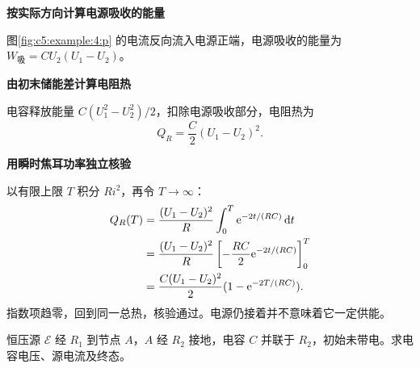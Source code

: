 \begin{solution}
\par\medskip{}\noindent\textbf{按实际方向计算电源吸收的能量}\par\nobreak
图\ref{fig:c5:example:4:p} 的电流反向流入电源正端，电源吸收的能量为 $W_{\text{吸}}=CU_2(U_1-U_2)$。

\par\medskip{}\noindent\textbf{由初末储能差计算电阻热}\par\nobreak
电容释放能量 $C(U_1^2-U_2^2)/2$，扣除电源吸收部分，电阻热为
\[
 Q_R=\frac C2(U_1-U_2)^2.
\]


\par\medskip{}\noindent\textbf{用瞬时焦耳功率独立核验}\par\nobreak
以有限上限 $T$ 积分 $Ri^2$，再令 $T\to\infty$：
\[
 \begin{aligned}
 Q_R(T)&=\frac{(U_1-U_2)^2}{R}\int_0^T\mathrm e^{-2t/(RC)}\mathop{}\!\mathrm d t\\
 &=\frac{(U_1-U_2)^2}{R}
 \left[-\frac{RC}{2}\mathrm e^{-2t/(RC)}\right]_0^T\\
 &=\frac{C(U_1-U_2)^2}{2}(1-\mathrm e^{-2T/(RC)}).
 \end{aligned}
\]
指数项趋零，回到同一总热，核验通过。电源仍接着并不意味着它一定供能。\end{solution}
\begin{question}\begin{example}[经分压网络充电的时间常数]\label{c5:example:5}
恒压源 $\mathcal E$ 经 $R_1$ 到节点 $A$，$A$ 经 $R_2$ 接地，电容 $C$ 并联于 $R_2$，初始未带电。求电容电压、源电流及终态。
\end{example}
\end{question}
